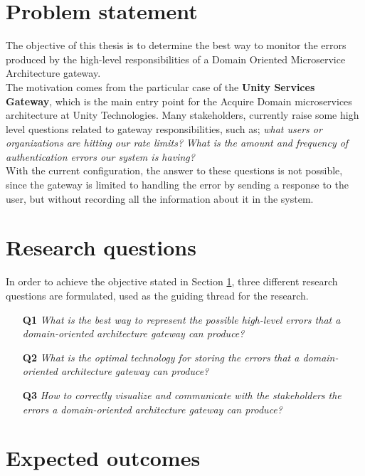 \documentclass[12pt]{article}
\begin{document}
\section{Problem statement}
\label{sec:problem-statement}

The objective of this thesis is to determine the best way to monitor the errors produced by the high-level responsibilities of a Domain Oriented Microservice Architecture gateway. \\

The motivation comes from the particular case of the \textbf{Unity Services Gateway}, which is the main entry point for the Acquire Domain microservices architecture at Unity Technologies. Many stakeholders, currently raise some high level questions related to gateway responsibilities, such as; \textit{what users or organizations are hitting our rate limits?} \textit{What is the amount and frequency of authentication errors our system is having?}\\

With the current configuration, the answer to these questions is not possible, since the gateway is limited to handling the error by sending a response to the user, but without recording all the information about it in the system.

\section{Research questions}
\label{sec:research-questions}

In order to achieve the objective stated in Section \ref{sec:problem-statement}, three different research questions are formulated, used as the guiding thread for the research.

\begin{itemize}
    \item[\textbf{Q1}] \textit{What is the best way to represent the possible high-level errors that a domain-oriented architecture gateway can produce?}
    \item[\textbf{Q2}] \textit{What is the optimal technology for storing the errors that a domain-oriented architecture gateway can produce?}
    \item[\textbf{Q3}] \textit{How to correctly visualize and communicate with the stakeholders the errors a domain-oriented architecture gateway can produce?}
\end{itemize}

\section{Expected outcomes}
\end{document}
